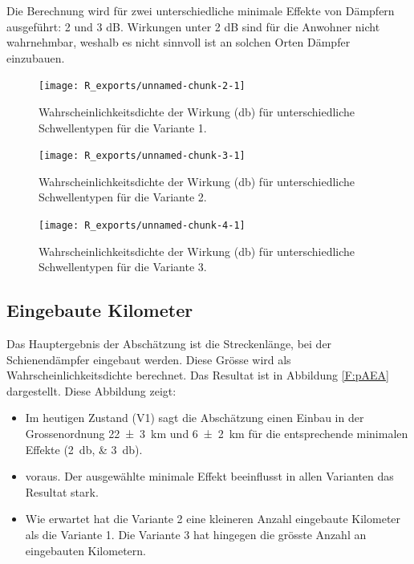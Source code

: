 Die Berechnung wird für zwei unterschiedliche minimale Effekte von Dämpfern ausgeführt: 2 und 3 dB. Wirkungen unter 2 dB sind für die Anwohner nicht wahrnehmbar, weshalb es nicht sinnvoll ist an solchen Orten Dämpfer einzubauen. 
\begin{figure}[!h]
\centering
\begin{knitrout}
\color{fgcolor}
\texttt{[image: R\_exports/unnamed-chunk-2-1]} 

\end{knitrout}
	\caption{ Wahrscheinlichkeitsdichte der Wirkung (\si{\decibel}) für unterschiedliche Schwellentypen für die Variante 1.}
	\label{F:distVar1}
\end{figure}
\begin{figure}[!h]
\centering
\begin{knitrout}
\color{fgcolor}
\texttt{[image: R\_exports/unnamed-chunk-3-1]} 

\end{knitrout}
	\caption{Wahrscheinlichkeitsdichte der Wirkung (\si{\decibel}) für unterschiedliche Schwellentypen für die Variante 2.}
	\label{F:distVar2}
\end{figure}
\begin{figure}[!h]
\centering
\begin{knitrout}
\color{fgcolor}
\texttt{[image: R\_exports/unnamed-chunk-4-1]} 

\end{knitrout}
	\caption{Wahrscheinlichkeitsdichte der Wirkung (\si{\decibel}) für unterschiedliche Schwellentypen für die Variante 3.}
	\label{F:distVar3}
\end{figure}

\FloatBarrier
\subsection{Eingebaute Kilometer}
Das Hauptergebnis der Abschätzung ist die Streckenlänge, bei der Schienendämpfer eingebaut werden. Diese Grösse wird als Wahrscheinlichkeitsdichte berechnet. Das Resultat ist in Abbildung \ref{F:pAEA} dargestellt. Diese Abbildung zeigt: 
\begin{itemize}
\item Im heutigen Zustand (V1) sagt die Abschätzung einen Einbau in der Grossenordnung \SI{22 \pm 3}{\km} und \SI{6 \pm 2}{\km} für die entsprechende minimalen Effekte (\SIlist{2;3}{\decibel}).
\item voraus. Der ausgewählte minimale Effekt beeinflusst in allen Varianten das Resultat stark. 

\item Wie erwartet hat die Variante 2 eine kleineren Anzahl eingebaute Kilometer als die Variante 1. 
Die Variante 3 hat hingegen die grösste Anzahl an eingebauten Kilometern.
\end{itemize}

